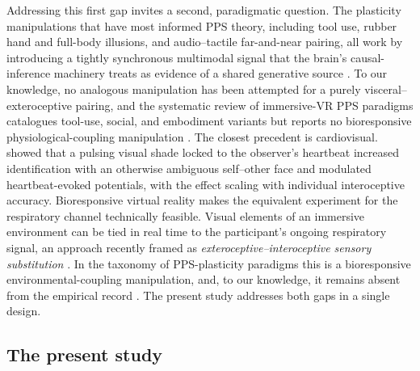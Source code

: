 Addressing this first gap invites a second, paradigmatic question. The plasticity manipulations that have most informed PPS theory, including tool use, rubber hand and full-body illusions, and audio--tactile far-and-near pairing, all work by introducing a tightly synchronous multimodal signal that the brain's causal-inference machinery treats as evidence of a shared generative source \citep{samad_2015, chancel_2021, costantini_2016, parise_2016}. To our knowledge, no analogous manipulation has been attempted for a purely visceral--exteroceptive pairing, and the systematic review of immersive-VR PPS paradigms catalogues tool-use, social, and embodiment variants but reports no bioresponsive physiological-coupling manipulation \citep{karakoc_2025}. The closest precedent is cardiovisual. \citet{sel_2016} showed that a pulsing visual shade locked to the observer's heartbeat increased identification with an otherwise ambiguous self--other face and modulated heartbeat-evoked potentials, with the effect scaling with individual interoceptive accuracy. Bioresponsive virtual reality makes the equivalent experiment for the respiratory channel technically feasible. Visual elements of an immersive environment can be tied in real time to the participant's ongoing respiratory signal, an approach recently framed as \emph{exteroceptive--interoceptive sensory substitution} \citep{Goral2024}. In the taxonomy of PPS-plasticity paradigms this is a bioresponsive environmental-coupling manipulation, and, to our knowledge, it remains absent from the empirical record \citep{karakoc_2025, serino2017peripersonal, belli2021breathink, Belli2024}. The present study addresses both gaps in a single design.

\subsection{The present study}


